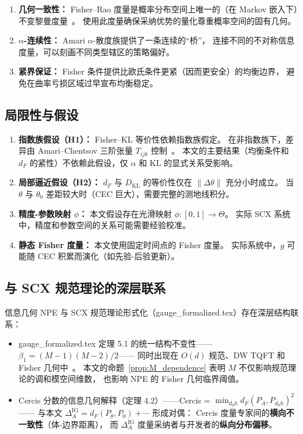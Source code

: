 \documentclass[12pt,a4paper]{article}
\theoremstyle{definition}
\theoremstyle{remark}
\newcommand{\Fisher}{g}
\newcommand{\KL}{D_{\text{KL}}}
\begin{document}
\begin{enumerate}[label=(\arabic*)]
    \item \textbf{几何一致性：} Fisher--Rao 度量是概率分布空间上唯一的（在 Markov 嵌入下）不变黎曼度量~\cite{chentzov1982statistical,cencov2000statistical}。
    使用此度量确保采纳优势的量化尊重概率空间的固有几何。
    \item \textbf{$\alpha$-连续性：} Amari $\alpha$-散度族提供了一条连续的“桥”，
    连接不同的不对称信息度量，可以刻画不同类型辖区的策略偏好。
    \item \textbf{紧界保证：} Fisher 条件提供比欧氏条件更紧（因而更安全）的均衡边界，
    避免在曲率亏损区域过早宣布均衡稳定。
\end{enumerate}

\subsection{局限性与假设}

\begin{enumerate}[label=(\textbf{L\arabic*}), leftmargin=*]
    \item \textbf{指数族假设（H1）：} Fisher--KL 等价性依赖指数族假定。
    在非指数族下，差异由 Amari--Chentsov 三阶张量 $T_{ijk}$ 控制~\cite{amari2016information}。
    本文的主要结果（均衡条件和 $d_F$ 的紧性）不依赖此假设，仅 $\alpha$ 和 KL 的显式关系受影响。
    \item \textbf{局部逼近假设（H2）：} $d_F$ 与 $\KL$ 的等价性仅在 $\|\Delta\theta\|$ 充分小时成立。
    当 $\theta$ 与 $\theta_0$ 差距较大时（CEC 巨大），需要完整的测地线积分。
    \item \textbf{精度-参数映射 $\phi$：} 本文假设存在光滑映射 $\phi: [0,1] \to \Theta$。
    实际 SCX 系统中，精度和参数空间的关系可能需要经验校准。
    \item \textbf{静态 Fisher 度量：} 本文使用固定时间点的 Fisher 度量。
    实际系统中，$\Fisher$ 可能随 CEC 积累而演化（如先验-后验更新）。
\end{enumerate}

\subsection{与 SCX 规范理论的深层联系}

信息几何 NPE 与 SCX 规范理论形式化（gauge\_formalized.tex）存在深层结构联系：

\begin{itemize}
    \item gauge\_formalized.tex 定理 5.1 的统一结构不变性——$\beta_1 = (M-1)(M-2)/2$——
    同时出现在 $O(d)$ 规范、DW TQFT 和 Fisher 几何中~\cite{scx_gauge_formalized}。
    本文的命题~\ref{prop:M_dependence} 表明 $M$ 不仅影响规范理论的调和模空间维数，
    也影响 NPE 的 Fisher 几何临界阈值。
    \item Cercis 分数的信息几何解释（定理 4.2）——Cercis = $\min_{d_0 h} d_F(P_A, P_{d_0 h})^2$——
    与本文 $\Delta_A^{\text{IG}} = d_F(P_\theta, P_0) + \cdots$ 形成对偶：
    Cercis 度量专家间的\textbf{横向不一致性}（体-边界距离），
    而 $\Delta_A^{\text{IG}}$ 度量采纳者与开发者的\textbf{纵向分布偏移}。
\end{itemize}
\end{document}
